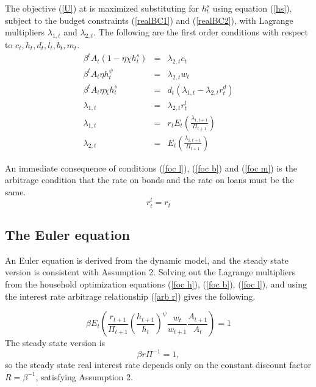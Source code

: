 \documentclass[]{article}
\begin{document}
The objective (\ref{U}) at is maximized substituting for $h_{t}^{s}$
using equation (\ref{hs}), subject to the budget constraints (\ref{realBC1}) and (\ref{realBC2}), with Lagrange
multipliers $\lambda _{1,t}$ and $\lambda _{2,t}$. The following are the first order conditions with respect to
$c_{t},h_{t},d_{t},l_{t},b_{t},m_{t}$.%
\begin{eqnarray}
\beta^{t}A_{t}\left(1-\eta \chi h_{t}^{s}\right) &=&\lambda _{2,t}c_{t} \label{foc c} \\
\beta^{t}A_{t}\eta h_{t}^{\psi} &=&\lambda _{2,t}w_{t} \label{foc h} \\
\beta^{t}A_{t}\eta \chi h_{t}^{s} &=&d_{t}\left(\lambda _{1,t}-\lambda
_{2,t}r_{t}^{d}\right) \label{foc d} \\
\lambda _{1,t} &=&\lambda _{2,t}r_{t}^{l} \label{foc l} \\
\lambda _{1,t} &=& r_{t}E_{t}\left(\frac{\lambda _{1,t+1}}{\Pi_{t+1}}\right) \label{foc b}\\
\lambda _{2,t} &=&E_{t}\left(\frac{\lambda _{1,t+1}}{\Pi _{t+1}}\right) \label{foc m}
\end{eqnarray}

An immediate consequence of conditions (\ref{foc l}), (\ref{foc b}) and (\ref{foc m}) is the arbitrage condition that the rate on bonds and the rate on loans must be the same.
\begin{equation}
r^{l}_{t}=r_{t} \label{arb r}
\end{equation}

\subsection{The Euler equation}

An Euler equation is derived from the dynamic model, and the steady state version is consistent with Assumption 2. Solving out the Lagrange multipliers from the household optimization equations (\ref{foc h}), (\ref{foc b}), (\ref{foc l}), and using the interest rate arbitrage relationship (\ref{arb r}) gives the following.

\begin{equation}
    \beta E_{t}\left(\frac{r_{t+1}}{\Pi_{t+1}}\left(\frac{h_{t+1}}{h_{t}}\right)^{\psi}\frac{w_{t}}{w_{t+1}}\frac{A_{t+1}}{A_{t}}\right)=1 
    \label{Euler}
\end{equation}
The steady state version is
\begin{equation}
    \beta r\Pi^{-1}=1, \label{Euler ss}
\end{equation}
so the steady state real interest rate depends only on the constant discount factor $R=\beta^{-1}$, satisfying Assumption 2.
\end{document}
